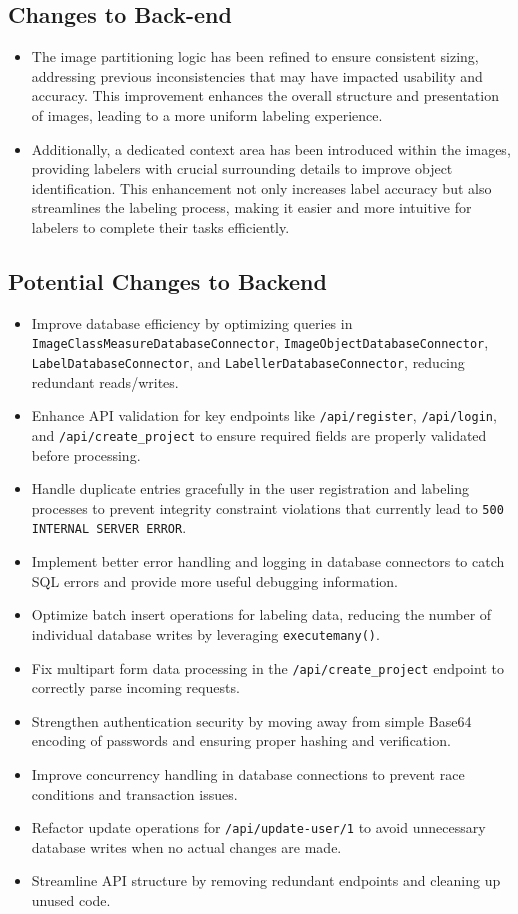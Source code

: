 \documentclass[12pt, titlepage]{article}
\begin{document}
\subsection{Changes to Back-end}
\begin{itemize}
    \item The image partitioning logic has been refined to ensure consistent sizing, addressing previous inconsistencies that may have impacted usability and accuracy. This improvement enhances the overall structure and presentation of images, leading to a more uniform labeling experience.
    \item Additionally, a dedicated context area has been introduced within the images, providing labelers with crucial surrounding details to improve object identification. This enhancement not only increases label accuracy but also streamlines the labeling process, making it easier and more intuitive for labelers to complete their tasks efficiently.
\end{itemize}

\subsection{Potential Changes to Backend}
\begin{itemize}
    \item Improve database efficiency by optimizing queries in \texttt{ImageClassMeasureDatabaseConnector}, \texttt{ImageObjectDatabaseConnector}, \texttt{LabelDatabaseConnector}, and \texttt{LabellerDatabaseConnector}, reducing redundant reads/writes.
    \item Enhance API validation for key endpoints like \texttt{/api/register}, \texttt{/api/login}, and \texttt{/api/create\_project} to ensure required fields are properly validated before processing.
    \item Handle duplicate entries gracefully in the user registration and labeling processes to prevent integrity constraint violations that currently lead to \texttt{500 INTERNAL SERVER ERROR}.
    \item Implement better error handling and logging in database connectors to catch SQL errors and provide more useful debugging information.
    \item Optimize batch insert operations for labeling data, reducing the number of individual database writes by leveraging \texttt{executemany()}.
    \item Fix multipart form data processing in the \texttt{/api/create\_project} endpoint to correctly parse incoming requests.
    \item Strengthen authentication security by moving away from simple Base64 encoding of passwords and ensuring proper hashing and verification.
    \item Improve concurrency handling in database connections to prevent race conditions and transaction issues.
    \item Refactor update operations for \texttt{/api/update-user/1} to avoid unnecessary database writes when no actual changes are made.
    \item Streamline API structure by removing redundant endpoints and cleaning up unused code.
\end{itemize}
\end{document}
